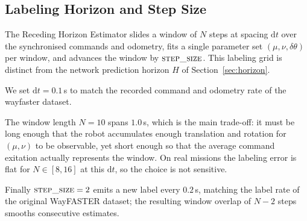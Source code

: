 \subsection{Labeling Horizon and Step Size}
\label{sec:labeling-horizon}

The Receding Horizon Estimator slides a window of $N$ steps at spacing
$\mathrm{d}t$ over the synchronised commands and odometry, fits a single
parameter set $(\mu,\nu,\delta\theta)$ per window, and advances the window by
$\textsc{step\_size}$. This labeling grid is distinct from the network
prediction horizon $H$ of Section~\ref{sec:horizon}.

We set $\mathrm{d}t = 0.1\,$s to match the recorded command and odometry rate of the wayfaster dataset.

The window length $N = 10$ spans $1.0\,$s, which is the main trade-off:
it must be long enough that the robot accumulates enough translation and rotation for $(\mu,\nu)$ to be observable,
yet short enough so that the average command exitation actually represents the window.
On real missions the labeling error is flat for $N \in [8,16]$ at this $\mathrm{d}t$,
so the choice is not sensitive.

Finally $\textsc{step\_size} = 2$ emits a new
label every $0.2\,$s, matching the label rate of the original WayFASTER dataset;
the resulting window overlap of $N-2$ steps smooths consecutive estimates.
